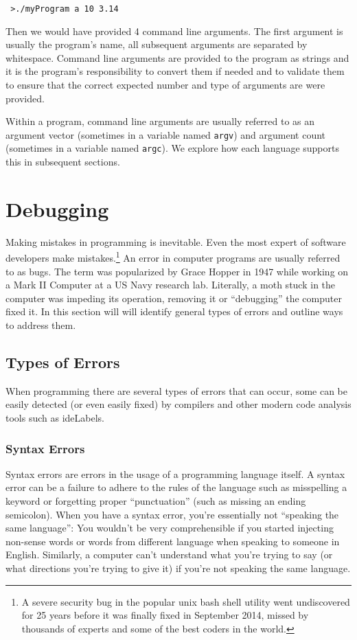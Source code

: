 \texttt{~>./myProgram a 10 3.14}

Then we would have provided 4 command line arguments.  The first argument is usually
the program's name, all subsequent arguments are separated by whitespace.  Command
line arguments are provided to the program as strings and it is the program's responsibility
to convert them if needed and to validate them to ensure that the correct expected number
and type of arguments are were provided.

Within a program, command line arguments are usually referred to as an argument vector
(sometimes in a variable named \texttt{argv}) and argument count (sometimes
in a variable named \texttt{argc}).  We explore how each language supports this
in subsequent sections.

\section{Debugging}

Making mistakes in programming is inevitable.  Even the most expert of software 
developers make mistakes.\footnote{A severe security bug in the popular unix 
bash shell utility went undiscovered for 25 years before it was finally 
fixed in September 2014, missed by thousands of experts and some of the
best coders in the world.}  An error in computer programs are usually 
referred to as \glspl{bug}.  The term was popularized by Grace Hopper in 
1947 while working on a Mark II Computer at a US Navy research lab.  
Literally, a moth stuck in the computer was impeding its operation, removing it 
or ``debugging'' the computer fixed it.  In this section will will identify general
types of errors and outline ways to address them.

\subsection{Types of Errors}

When programming there are several types of errors that can occur, some 
can be easily detected (or even easily fixed) by compilers and other modern 
code analysis tools such as \glspl{ideLabel}.

\subsubsection{Syntax Errors}

Syntax errors are errors in the usage of a programming language itself.  A syntax
error can be a failure to adhere to the rules of the language such as misspelling 
a keyword or forgetting proper ``punctuation'' (such as missing an ending semicolon).
When you have a syntax error, you're essentially not ``speaking the same language'':
You wouldn't be very comprehensible if you started injecting non-sense words 
or words from different language when speaking to someone in English.  Similarly,
a computer can't understand what you're trying to say (or what directions you're 
trying to give it) if you're not speaking the same language.

